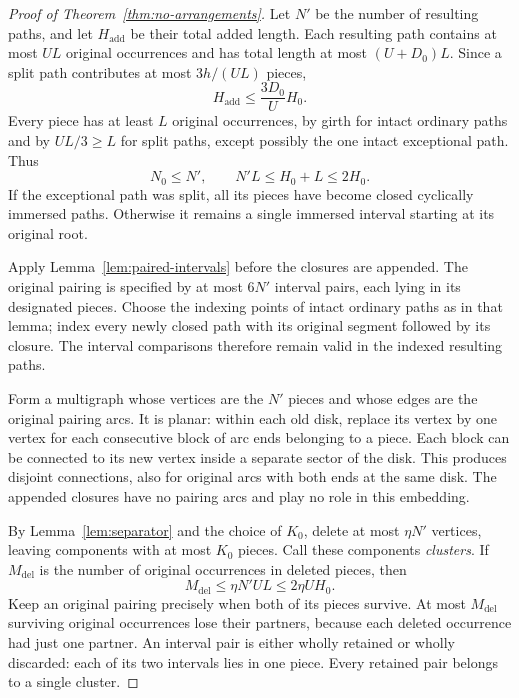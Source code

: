 \begin{proof}[Proof of Theorem~\ref{thm:no-arrangements}]
Let $N'$ be the number of resulting paths, and let $H_{\mathrm{add}}$
be their total added length.  Each resulting path contains at most
$UL$ original occurrences and has total length at most $(U+D_0)L$.
Since a split path contributes at most $3h/(UL)$ pieces,
\begin{equation}
 H_{\mathrm{add}}\le\frac{3D_0}{U}H_0.
 \label{eq:added-length}
\end{equation}
Every piece has at least $L$ original occurrences, by girth for intact
ordinary paths and by $UL/3\ge L$ for split paths, except possibly the
one intact exceptional path.  Thus
\begin{equation}
 N_0\le N',\qquad N'L\le H_0+L\le2H_0.
 \label{eq:extraction-piece-count}
\end{equation}
If the exceptional path was split, all its pieces have become closed
cyclically immersed paths.  Otherwise it remains a single immersed
interval starting at its original root.

Apply Lemma~\ref{lem:paired-intervals} before the closures are appended.
The original pairing is specified by at most $6N'$ interval pairs,
each lying in its designated pieces.  Choose the indexing points of
intact ordinary paths as in that lemma; index every newly closed path
with its original segment followed by its closure.  The interval
comparisons therefore remain valid in the indexed resulting paths.

Form a multigraph whose vertices are the $N'$ pieces and whose edges
are the original pairing arcs.  It is planar: within each old disk,
replace its vertex by one vertex for each consecutive block of arc
ends belonging to a piece.  Each block can be connected to its new
vertex inside a separate sector of the disk.  This produces disjoint
connections, also for original arcs with both ends at the same disk.
The appended closures have no pairing arcs and play no role in this
embedding.

By Lemma~\ref{lem:separator} and the choice of $K_0$, delete at most
$\eta N'$ vertices, leaving components with at most $K_0$ pieces.
Call these components \emph{clusters}.  If $M_{\mathrm{del}}$ is the
number of original occurrences in deleted pieces, then
\begin{equation}
 M_{\mathrm{del}}\le\eta N'UL\le2\eta U H_0.
 \label{eq:deleted-occurrences}
\end{equation}
Keep an original pairing precisely when both of its pieces survive.
At most $M_{\mathrm{del}}$ surviving original occurrences lose their
partners, because each deleted occurrence had just one partner.
An interval pair is either wholly retained or wholly discarded:
each of its two intervals lies in one piece.  Every retained pair
belongs to a single cluster.


\end{proof}
